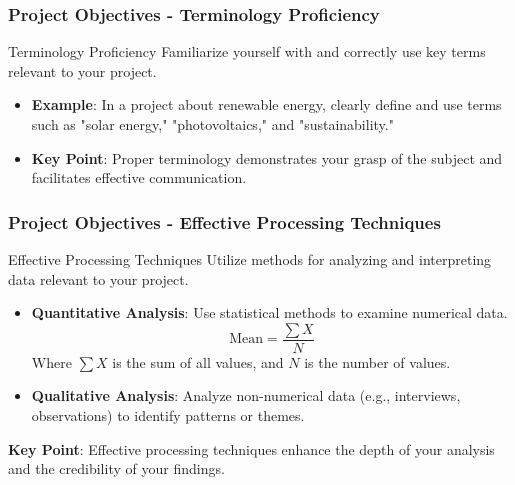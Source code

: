 \documentclass[aspectratio=169]{beamer}
\begin{document}
\begin{frame}[fragile]
    \frametitle{Project Objectives - Terminology Proficiency}
    \begin{block}{Terminology Proficiency}
        Familiarize yourself with and correctly use key terms relevant to your project.
    \end{block}
    
    \begin{itemize}
        \item \textbf{Example}: In a project about renewable energy, clearly define and use terms such as "solar energy," "photovoltaics," and "sustainability."
        \item \textbf{Key Point}: Proper terminology demonstrates your grasp of the subject and facilitates effective communication.
    \end{itemize}
\end{frame}

\begin{frame}[fragile]
    \frametitle{Project Objectives - Effective Processing Techniques}
    \begin{block}{Effective Processing Techniques}
        Utilize methods for analyzing and interpreting data relevant to your project.
    \end{block}
    
    \begin{itemize}
        \item \textbf{Quantitative Analysis}: Use statistical methods to examine numerical data. 
        \begin{equation}
            \text{Mean} = \frac{\sum X}{N}
        \end{equation}
        Where \( \sum X \) is the sum of all values, and \( N \) is the number of values.
        
        \item \textbf{Qualitative Analysis}: Analyze non-numerical data (e.g., interviews, observations) to identify patterns or themes.
    \end{itemize}
    
    \textbf{Key Point}: Effective processing techniques enhance the depth of your analysis and the credibility of your findings.
\end{frame}
\end{document}
